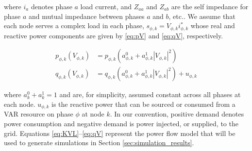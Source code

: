 \noindent where $i_{a}$ denotes phase $a$ load current, and $Z_{aa}$ and $Z_{ab}$ are the self impedance for phase $a$ and mutual impedance between phases $a$ and $b$, etc..  We assume that each node serves a complex load in each phase, $s_{\phi,k} = V_{\phi,k}i_{\phi,k}^{*}$ whose real and reactive power components are given by \eqref{eq:pV} and \eqref{eq:qV}, respectively.

\begin{align}
	p_{\phi,k} ( V_{\phi,k} ) & = p_{\phi,k} \left(a_{\phi,k}^{0} + a_{\phi,k}^{1} \left| V_{\phi,k} \right|^2 \right)
    \label{eq:pV}
    \\
    q_{\phi,k} ( V_{\phi,k} ) & = q_{\phi,k} \left(a_{\phi,k}^{0} + a_{\phi,k}^{1} \left| V_{\phi,k} \right|^2 \right) + u_{\phi,k}
    \label{eq:qV}
\end{align}

\noindent where $a_{k}^{0} + a_{k}^{1} = 1$ and are, for simplicity, assumed constant across all phases at each node.  $u_{\phi,k}$ is the reactive power that can be sourced or consumed from a VAR resource on phase $\phi$ at node $k$. In our convention, positive demand denotes power consumption and negative demand is power injected, or supplied, to the grid.  Equations \eqref{eq:KVL}--\eqref{eq:qV} represent the power flow model that will be used to generate simulations in Section \ref{sec:simulation_results}.  






